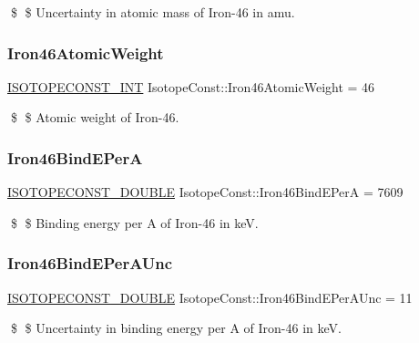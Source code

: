 \$ \$ Uncertainty in atomic mass of Iron-\/46 in amu. \mbox{\label{group___isotope_const-_iron-_fe46_ga3be6e409668b4c27234dcdfc02b5ae5d}} 
\subsubsection{\texorpdfstring{Iron46\+Atomic\+Weight}{Iron46AtomicWeight}}
{\footnotesize\ttfamily \mbox{\hyperlink{group___isotope_const-_macros_ga5f18360b3e99483a35c32d789e62621c}{I\+S\+O\+T\+O\+P\+E\+C\+O\+N\+S\+T\+\_\+\+I\+NT}} Isotope\+Const\+::\+Iron46\+Atomic\+Weight = 46}

\$ \$ Atomic weight of Iron-\/46. \mbox{\label{group___isotope_const-_iron-_fe46_ga6c386fbddb35a388991dd129ea5bf15a}} 
\subsubsection{\texorpdfstring{Iron46\+Bind\+E\+PerA}{Iron46BindEPerA}}
{\footnotesize\ttfamily \mbox{\hyperlink{group___isotope_const-_macros_ga8f45a7272ce02c0b4c65c44636ed719a}{I\+S\+O\+T\+O\+P\+E\+C\+O\+N\+S\+T\+\_\+\+D\+O\+U\+B\+LE}} Isotope\+Const\+::\+Iron46\+Bind\+E\+PerA = 7609}

\$ \$ Binding energy per A of Iron-\/46 in keV. \mbox{\label{group___isotope_const-_iron-_fe46_ga259756193ee63a1c45d5dcf620c72899}} 
\subsubsection{\texorpdfstring{Iron46\+Bind\+E\+Per\+A\+Unc}{Iron46BindEPerAUnc}}
{\footnotesize\ttfamily \mbox{\hyperlink{group___isotope_const-_macros_ga8f45a7272ce02c0b4c65c44636ed719a}{I\+S\+O\+T\+O\+P\+E\+C\+O\+N\+S\+T\+\_\+\+D\+O\+U\+B\+LE}} Isotope\+Const\+::\+Iron46\+Bind\+E\+Per\+A\+Unc = 11}

\$ \$ Uncertainty in binding energy per A of Iron-\/46 in keV. \mbox{\label{group___isotope_const-_iron-_fe46_ga274eff4ba7e101920f9e44125f1fd686}} 
